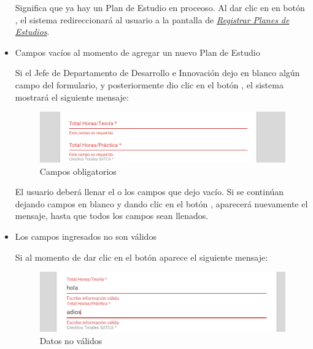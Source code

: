 \begin{itemize}
	Significa que ya hay un Plan de Estudio en proceoso. Al dar clic en en botón , el sistema redireccionará al usuario a la pantalla de \hyperlink{registrarPE}{\textit{Registrar Planes de Estudios}}.

	\item Campos vacíos al momento de agregar un nuevo Plan de Estudio

	Si el Jefe de Departamento de Desarrollo e Innovación dejo en blanco algún campo del formulario, y posteriormente dio clic en el botón , el sistema mostrará el siguiente mensaje:
		\begin{figure}[!hbtp]
		\centering
		\hypertarget{ms4}{\includegraphics[width=0.7\linewidth]{images/SP4-GPE/m4}}
		\caption{Campos obligatorios}
		\label{ms4}
	    \end{figure}

	El usuario deberá llenar el o los campos que dejo vacío. Si se continúan dejando campos en blanco y dando clic en el botón , aparecerá nuevamente el mensaje, hasta que todos los campos sean llenados.\\

	\newpage

	\item Los campos ingresados no son válidos

	Si al momento de dar clic en el botón  aparece el siguiente mensaje:
	\begin{figure}[!hbtp]
		\centering
		\hypertarget{ms5}{\includegraphics[width=0.7\linewidth]{images/SP4-GPE/m5}}
		\caption{Datos no válidos}
		\label{ms5}
	\end{figure}

\end{itemize}
